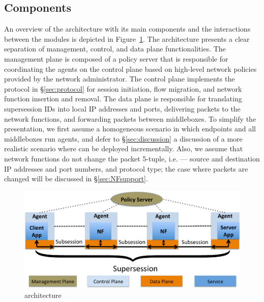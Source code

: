 \subsection{Components}

An overview of  the \system architecture  with its main components and
the    interactions     between   the    modules    is    depicted  in
Figure~\ref{architecture}.   The  architecture     presents    a clear
separation of  management,  control, and  data plane functionalities.
The management  plane   is composed   of  a   policy server that    is
responsible for coordinating the agents on  the control plane based on
high-level network policies provided by the network administrator. The
control  plane implements   the protocol  in  \S\ref{sec:protocol} for
session initiation, flow migration, and network function insertion and
removal.   The data plane is  responsible for translating supersession
IDs  into local IP addresses    and ports, delivering  packets to  the
network functions,  and forwarding   packets between  middleboxes.  To
simplify  the presentation, we first  assume a homogeneous scenario in
which endpoints  and all middleboxes run \system  agents, and defer to
\S\ref{sec:discussion} a discussion of a more realistic scenario where
\system  can be deployed incrementally.  Also,  we assume that network
functions  do  not   change  the  packet  5-tuple, i.e. ---  source and
destination IP addresses  and  port numbers,  and protocol type;  the
case    where     packets  are   changed    will    be   discussed  in
\S\ref{sec:NFsupport}.

\begin{figure}[hb]
\includegraphics[width=\linewidth]{figures/archi.pdf}
\caption{\small\system architecture}\label{architecture}
\end{figure}


